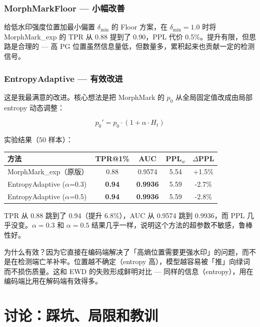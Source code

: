 \documentclass[11pt,a4paper]{article}
\begin{document}
\subsubsection*{MorphMarkFloor — 小幅改善}

给低水印强度位置加最小偏置 $\delta_{\min}$ 的 Floor 方案，在 $\delta_{\min}=1.0$ 时将 MorphMark\_exp 的 TPR 从 0.88 提到了 0.90，PPL 代价 0.5\%。提升有限，但思路是合理的 — 高 PG 位置虽然信息量低，但数量多，累积起来也贡献一定的检测信号。

\subsubsection*{EntropyAdaptive — 有效改进}

这是我最满意的改进。核心想法是把 MorphMark 的 $p_0$ 从全局固定值改成由局部 entropy 动态调整：

\begin{equation}
p_0' = p_0 \cdot (1 + \alpha \cdot H_t)
\end{equation}

实验结果（50 样本）：

\begin{table}[H]
\centering
\begin{tabular}{@{}lcccc@{}}
\toprule
\textbf{方法} & \textbf{TPR@1\%} & \textbf{AUC} & \textbf{PPL$_w$} & \textbf{$\Delta$PPL} \\
\midrule
MorphMark\_exp（原版） & 0.88 & 0.9574 & 5.54 & +1.5\% \\
EntropyAdaptive ($\alpha$=0.3) & \textbf{0.94} & \textbf{0.9936} & 5.59 & -2.7\% \\
EntropyAdaptive ($\alpha$=0.5) & \textbf{0.94} & \textbf{0.9936} & 5.59 & -2.8\% \\
\bottomrule
\end{tabular}
\end{table}

TPR 从 0.88 跳到了 0.94（提升 6.8\%），AUC 从 0.9574 跳到 0.9936，而 PPL 几乎没变。$\alpha=0.3$ 和 $\alpha=0.5$ 结果几乎一样，说明这个方法的超参数不敏感，鲁棒性好。

为什么有效？因为它直接在编码端解决了「高熵位置需要更强水印」的问题，而不是在检测端亡羊补牢。位置越不确定（entropy 高），模型越容易被「推」向绿词而不损伤质量。这和 EWD 的失败形成鲜明对比 — 同样的信息（entropy），用在编码端比用在解码端有效得多。

\section{讨论：踩坑、局限和教训}
\end{document}
